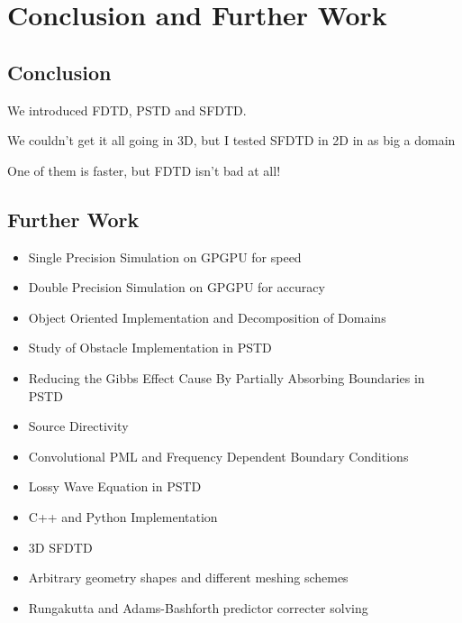 %
%
%
\chapter{Conclusion and Further Work}
\section{Conclusion}
We introduced FDTD, PSTD and SFDTD.

We couldn't get it all going in 3D, but I tested SFDTD in 2D in as big a domain

One of them is faster, but FDTD isn't bad at all!


\section{Further Work}
\begin{itemize}
\item Single Precision Simulation on GPGPU for speed
\item Double Precision Simulation on GPGPU for accuracy
\item Object Oriented Implementation and Decomposition of Domains
\item Study of Obstacle Implementation in PSTD
\item Reducing the Gibbs Effect Cause By Partially Absorbing Boundaries in PSTD
\item Source Directivity
\item Convolutional PML and Frequency Dependent Boundary Conditions
\item Lossy Wave Equation in PSTD
\item C++ and Python Implementation
\item 3D SFDTD
\item Arbitrary geometry shapes and different meshing schemes
\item Rungakutta and Adams-Bashforth predictor correcter solving
\end{itemize}